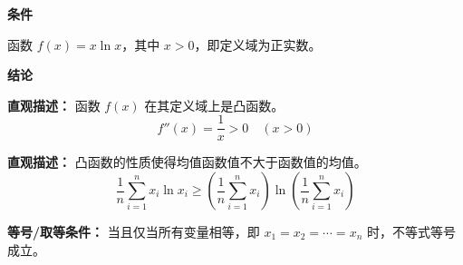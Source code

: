 \begin{statementbox}

\textbf{\textcolor{CStatement}{条件}}
\begin{description}[style=nextline, leftmargin=2.8em, labelsep=0.5em, itemsep=0.35em]
    \item[\textbf{\textcolor{CStatement}{条件 1（定义域与函数）：}}] 函数 $f(x)=x\ln x$，其中 $x>0$，即定义域为正实数。
\end{description}

\textbf{\textcolor{CStatement}{结论}}
\begin{description}[style=nextline, leftmargin=2.8em, labelsep=0.5em, itemsep=0.45em]
    \item[\textbf{\textcolor{CStatement}{结论一（凸性判定）：}}]
    \textbf{\textcolor{CStatement}{直观描述：}} 函数 $f(x)$ 在其定义域上是凸函数。
    \[
    f''(x) = \frac{1}{x} > 0 \quad (x>0)
    \]

    \item[\textbf{\textcolor{CStatement}{推广结论（Jensen不等式）：}}]
    \textbf{\textcolor{CStatement}{直观描述：}} 凸函数的性质使得均值函数值不大于函数值的均值。
    \[
    \frac{1}{n}\sum_{i=1}^{n} x_i\ln x_i \geq \left(\frac{1}{n}\sum_{i=1}^{n} x_i\right)\ln\!\left(\frac{1}{n}\sum_{i=1}^{n} x_i\right)
    \]
\end{description}

\textbf{\textcolor{CStatement}{等号/取等条件：}} 当且仅当所有变量相等，即 $x_1 = x_2 = \cdots = x_n$ 时，不等式等号成立。

\end{statementbox}
